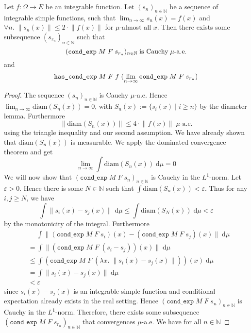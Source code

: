 \begin{lemma}
	Let $f : \Omega \rightarrow E$ be an integrable function. Let $(s_n)_{n \in \mathbb{N}}$ be a sequence of integrable simple functions, such that $\lim_{n \to \infty} s_n(x) = f(x)$ and $\forall n. \;\lVert s_n(x) \rVert \le 2 \cdot \lVert f(x) \rVert$ for $\mu$-almost all $x$. Then there exists some subsequence $(s_{r_n})_{n \in \mathbb{N}}$ such that
	\[
		\normalfont (\texttt{cond\_exp} \; M \; F \; s_{r_n})_{n \in \mathbb{N}} \; \textrm{is Cauchy} \; \mu\textrm{-a.e.}
	\]
	and
	\[
		\normalfont \texttt{has\_cond\_exp} \; M \; F \; f \; (\lim_{n \to \infty} \texttt{cond\_exp} \; M \; F \; s_{r_n})
	\]
\end{lemma}
\begin{proof}
	The sequence $(s_n)_{n \in \mathbb{N}}$ is Cauchy $\mu$-a.e. Hence $\lim_{n \to \infty} \textrm{diam}(S_n(x)) = 0$, with $S_n(x) := \{s_i(x) \; \vert \; i \ge n \}$ by the diameter lemma. Furthermore
	\[
		\lVert\textrm{diam}(S_n(x))\rVert \le 4 \cdot \lVert f(x) \rVert \; \mu\textrm{-a.e.}
	\]
	using the triangle inequality and our second assumption. We have already shown that $\textrm{diam}(S_n(x))$ is measurable. We apply the dominated convergence theorem and get
	\[
		\lim_{n \to \infty} \int \textrm{diam}(S_n(x)) \; \textrm{d}\mu = 0
	\]
	We will now show that $(\texttt{cond\_exp} \; M \; F \; s_n)_{n \in \mathbb{N}}$ is Cauchy in the $L^1$-norm.
	Let $\varepsilon > 0$. Hence there is some $N \in \mathbb{N}$ such that $\int \textrm{diam}(S_n(x)) < \varepsilon$. Thus for any $i,j \ge N$, we have
	\[
		\int \lVert s_i(x) - s_j(x) \rVert \; \textrm{d}\mu \le \int \textrm{diam}(S_N(x)) \; \textrm{d}\mu < \varepsilon
	\]
	by the monotonicity of the integral. Furthermore
	\begin{align*}
		&\quad\;\int \lVert (\texttt{cond\_exp} \; M \; F \; s_i)(x) - (\texttt{cond\_exp} \; M \; F \; s_j)(x) \rVert \; \textrm{d}\mu \\
		&= \int \lVert (\texttt{cond\_exp} \; M \; F \; (s_i - s_j))(x) \rVert \; \textrm{d}\mu \\
		&\le \int (\texttt{cond\_exp} \; M \; F \; (\lambda x.\; \lVert s_i(x) - s_j(x)\rVert))(x) \; \textrm{d}\mu \\
		&= \int \lVert s_i(x) - s_j(x)\rVert \; \textrm{d}\mu \\
		&< \varepsilon
	\end{align*}
	since $s_i(x)-s_j(x)$ is an integrable simple function and conditional expectation already exists in the real setting. Hence $(\texttt{cond\_exp} \; M \; F \; s_n)_{n \in \mathbb{N}}$ is Cauchy in the $L^1$-norm. Therefore, there exists some subsequence $(\texttt{cond\_exp} \; M \; F \; s_{r_n})_{n \in \mathbb{N}}$ that convergences $\mu$-a.e. We have for all $n \in \mathbb{N}$

\end{proof}
